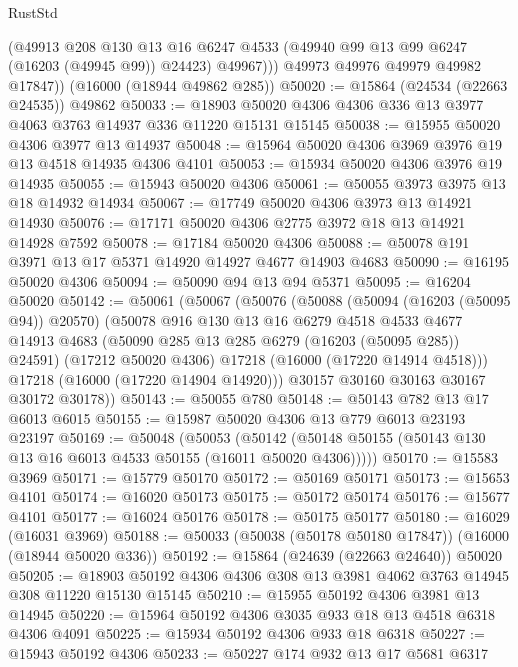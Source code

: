 \begin{lexlean}{RustStd}
\begin{coremodule}
            (@49913
              @208
              @130
              @13
              @16
              @6247
              @4533
              (@49940 @99 @13 @99 @6247 (@16203 (@49945 @99)) @24423)
              @49967)))
        @49973
        @49976
        @49979
        @49982
        @17847))
    (@16000 (@18944 @49862 @285))
@50020 := @15864 (@24534 (@22663 @24535)) @49862
@50033 := @18903 @50020 @4306 @4306 @336 @13 @3977 @4063 @3763 @14937 @336 @11220 @15131 @15145
@50038 := @15955 @50020 @4306 @3977 @13 @14937
@50048 := @15964 @50020 @4306 @3969 @3976 @19 @13 @4518 @14935 @4306 @4101
@50053 := @15934 @50020 @4306 @3976 @19 @14935
@50055 := @15943 @50020 @4306
@50061 := @50055 @3973 @3975 @13 @18 @14932 @14934
@50067 := @17749 @50020 @4306 @3973 @13 @14921 @14930
@50076 := @17171 @50020 @4306 @2775 @3972 @18 @13 @14921 @14928 @7592
@50078 := @17184 @50020 @4306
@50088 := @50078 @191 @3971 @13 @17 @5371 @14920 @14927 @4677 @14903 @4683
@50090 := @16195 @50020 @4306
@50094 := @50090 @94 @13 @94 @5371
@50095 := @16204 @50020
@50142 := @50061
    (@50067
      (@50076
        (@50088
          (@50094 (@16203 (@50095 @94)) @20570)
          (@50078
            @916
            @130
            @13
            @16
            @6279
            @4518
            @4533
            @4677
            @14913
            @4683
            (@50090 @285 @13 @285 @6279 (@16203 (@50095 @285)) @24591)
            (@17212 @50020 @4306)
            @17218
            (@16000 (@17220 @14914 @4518)))
          @17218
          (@16000 (@17220 @14904 @14920)))
        @30157
        @30160
        @30163
        @30167
        @30172
        @30178))
@50143 := @50055 @780
@50148 := @50143 @782 @13 @17 @6013 @6015
@50155 := @15987 @50020 @4306 @13 @779 @6013 @23193 @23197
@50169 := @50048
    (@50053 (@50142 (@50148 @50155 (@50143 @130 @13 @16 @6013 @4533 @50155 (@16011 @50020 @4306)))))
@50170 := @15583 @3969
@50171 := @15779 @50170
@50172 := @50169 @50171
@50173 := @15653 @4101
@50174 := @16020 @50173
@50175 := @50172 @50174
@50176 := @15677 @4101
@50177 := @16024 @50176
@50178 := @50175 @50177
@50180 := @16029 (@16031 @3969)
@50188 := @50033 (@50038 (@50178 @50180 @17847)) (@16000 (@18944 @50020 @336))
@50192 := @15864 (@24639 (@22663 @24640)) @50020
@50205 := @18903 @50192 @4306 @4306 @308 @13 @3981 @4062 @3763 @14945 @308 @11220 @15130 @15145
@50210 := @15955 @50192 @4306 @3981 @13 @14945
@50220 := @15964 @50192 @4306 @3035 @933 @18 @13 @4518 @6318 @4306 @4091
@50225 := @15934 @50192 @4306 @933 @18 @6318
@50227 := @15943 @50192 @4306
@50233 := @50227 @174 @932 @13 @17 @5681 @6317

\end{coremodule}
\end{lexlean}
